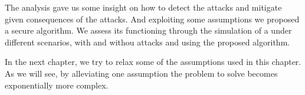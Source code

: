 \documentclass[../main.tex]{subfiles}
\begin{document}
The analysis gave us some insight on how to detect the attacks and mitigate given consequences of the attacks.
And exploiting some assumptions we proposed a secure \dmpc{} algorithm.
We assess its functioning through the simulation of a \dhn{} under different scenarios, with and withou attacks and using the proposed algorithm.

In the next chapter, we try to relax some of the assumptions used in this chapter.
As we will see, by alleviating one assumption the problem to solve becomes exponentially more complex.
\end{document}
